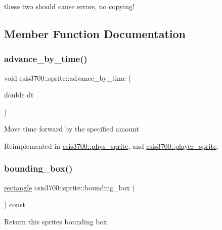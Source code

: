 these two should cause errors, no copying! 

\subsection{Member Function Documentation}
\mbox{\label{classcsis3700_1_1sprite_ac4d932bda87ce98a36579de3e1392a8f}} 
\subsubsection{\texorpdfstring{advance\+\_\+by\+\_\+time()}{advance\_by\_time()}}
{\footnotesize\ttfamily void csis3700\+::sprite\+::advance\+\_\+by\+\_\+time (\begin{DoxyParamCaption}\item[{double}]{dt }\end{DoxyParamCaption})\hspace{0.3cm}{\ttfamily [virtual]}}

Move time forward by the specified amount 

Reimplemented in \hyperlink{classcsis3700_1_1phys__sprite_a3bb24599b1bc2fd13846826308914db4}{csis3700\+::phys\+\_\+sprite}, and \hyperlink{classcsis3700_1_1player__sprite_ac2453e0b3934ac639d704c4ecca7493d}{csis3700\+::player\+\_\+sprite}.

\mbox{\label{classcsis3700_1_1sprite_a2ff6edefbdab7f1b49366bed16bfa6e5}} 
\subsubsection{\texorpdfstring{bounding\+\_\+box()}{bounding\_box()}}
{\footnotesize\ttfamily \hyperlink{classcsis3700_1_1rectangle}{rectangle} csis3700\+::sprite\+::bounding\+\_\+box (\begin{DoxyParamCaption}{ }\end{DoxyParamCaption}) const\hspace{0.3cm}{\ttfamily [virtual]}}

Return this sprite\textquotesingle{}s bounding box \mbox{\label{classcsis3700_1_1sprite_ac3092a26409694577c92ba6d9831c90a}} 
